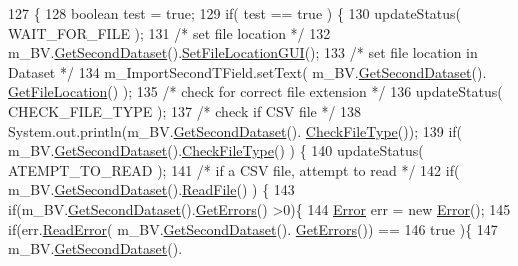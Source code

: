\begin{DoxyCode}
127                                         \{
128         \textcolor{keywordtype}{boolean} test = \textcolor{keyword}{true};
129         \textcolor{keywordflow}{if}( test == \textcolor{keyword}{true} ) \{
130             updateStatus( WAIT\_FOR\_FILE );
131             \textcolor{comment}{/* set file location */}
132             m\_BV.\hyperlink{class_bob_viz_a2826dca37585b5effe3a2f2222f17ada}{GetSecondDataset}().\hyperlink{class_dataset_a26dd0cb28ef8622366d67e21c38b5b0d}{SetFileLocationGUI}();
133             \textcolor{comment}{/* set file location in Dataset */}
134             m\_ImportSecondTField.setText( m\_BV.\hyperlink{class_bob_viz_a2826dca37585b5effe3a2f2222f17ada}{GetSecondDataset}().
      \hyperlink{class_dataset_a91fb1f2a983e9e5bef10864c0f4ec465}{GetFileLocation}() );
135             \textcolor{comment}{/* check for correct file extension */}
136             updateStatus( CHECK\_FILE\_TYPE );
137             \textcolor{comment}{/* check if CSV file */}
138             System.out.println(m\_BV.\hyperlink{class_bob_viz_a2826dca37585b5effe3a2f2222f17ada}{GetSecondDataset}().
      \hyperlink{class_dataset_a01147d9ebdff4ce95ed092143b4c5659}{CheckFileType}());
139             \textcolor{keywordflow}{if}( m\_BV.\hyperlink{class_bob_viz_a2826dca37585b5effe3a2f2222f17ada}{GetSecondDataset}().\hyperlink{class_dataset_a01147d9ebdff4ce95ed092143b4c5659}{CheckFileType}() ) \{
140                 updateStatus( ATEMPT\_TO\_READ );
141                 \textcolor{comment}{/* if a CSV file, attempt to read */}
142                 \textcolor{keywordflow}{if}( m\_BV.\hyperlink{class_bob_viz_a2826dca37585b5effe3a2f2222f17ada}{GetSecondDataset}().\hyperlink{class_dataset_a54d25635d79320caa77a9d6695e5cf3d}{ReadFile}() ) \{
143                     \textcolor{keywordflow}{if}(m\_BV.\hyperlink{class_bob_viz_a2826dca37585b5effe3a2f2222f17ada}{GetSecondDataset}().\hyperlink{class_dataset_a4a0a7e2a2a175ca3d0cebf9431b0e3f4}{GetErrors}() >0)\{
144                         \hyperlink{class_error}{Error} err = \textcolor{keyword}{new} \hyperlink{class_error}{Error}();
145                         \textcolor{keywordflow}{if}(err.\hyperlink{class_error_a56c2216c6ebe6f6b18625d901358ae77}{ReadError}( m\_BV.\hyperlink{class_bob_viz_a2826dca37585b5effe3a2f2222f17ada}{GetSecondDataset}().
      \hyperlink{class_dataset_a4a0a7e2a2a175ca3d0cebf9431b0e3f4}{GetErrors}()) == 
146                                 \textcolor{keyword}{true} )\{
147                             m\_BV.\hyperlink{class_bob_viz_a2826dca37585b5effe3a2f2222f17ada}{GetSecondDataset}().

\end{DoxyCode}
